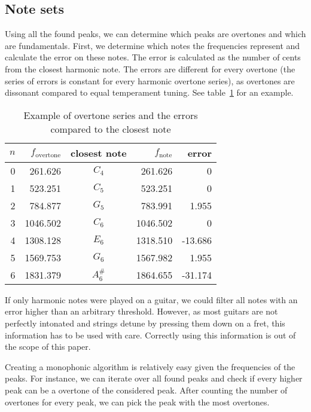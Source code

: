 \documentclass[10pt,twocolumn]{article}
\begin{document}
\subsection{Note sets}  \label{sub:impnoteset}
Using all the found peaks, we can determine which peaks are overtones and which are fundamentals. First, we determine which notes the frequencies represent and calculate the error on these notes. The error is calculated as the number of cents from the closest harmonic note. The errors are different for every overtone (the series of errors is constant for every harmonic overtone series), as overtones are dissonant compared to equal temperament tuning. See table~\ref{tab:overseries} for an example.
\begin{table}[H]\vspace{-3mm}
    \centering
    \begin{tabular}{rrcrr}
        $n$ & $f_{\text{overtone}}$ & closest note & $f_\text{note}$ & error \\
        \hline
        0 & 261.626  & $C_4$    & 261.626  &  0 \\
        1 & 523.251  & $C_5$    & 523.251  &  0 \\
        2 & 784.877  & $G_5$    & 783.991  &  1.955 \\
        3 & 1046.502 & $C_6$    & 1046.502 &  0 \\
        4 & 1308.128 & $E_6$    & 1318.510 &  -13.686 \\
        5 & 1569.753 & $G_6$    & 1567.982 &  1.955 \\
        6 & 1831.379 & $A^\#_6$ & 1864.655 &  -31.174 \\
    \end{tabular}
    \caption{Example of overtone series and the errors compared to the closest note}
    \label{tab:overseries}
\end{table}\vspace{-3mm}
If only harmonic notes were played on a guitar, we could filter all notes with an error higher than an arbitrary threshold. However, as most guitars are not perfectly intonated and strings detune by pressing them down on a fret, this information has to be used with care. Correctly using this information is out of the scope of this paper.

Creating a monophonic algorithm is relatively easy given the frequencies of the peaks. For instance, we can iterate over all found peaks and check if every higher peak can be a overtone of the considered peak. After counting the number of overtones for every peak, we can pick the peak with the most overtones.
\end{document}
